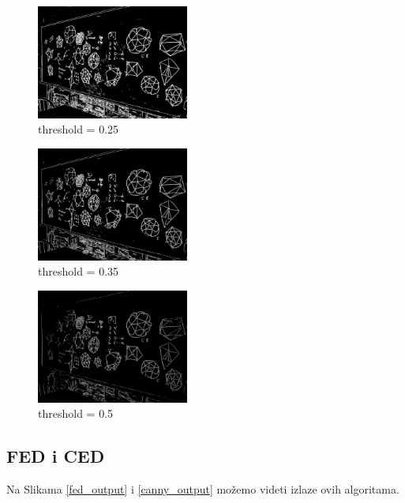 \documentclass[12pt,a4paper]{article}
\theoremstyle{definition}
\theoremstyle{remark}
\theoremstyle{plain}
\begin{document}
\begin{multicols}{3}
\begin{figure}[H]
\centering
\includegraphics[width=5cm]{images/blackboard_25.png}
  \caption{threshold = 0.25}
\end{figure}
\columnbreak
\begin{figure}[H]
\centering
\includegraphics[width=5cm]{images/blackboard_35.png}
  \caption{threshold = 0.35}
\end{figure}
\columnbreak
\begin{figure}[H]
\centering
\includegraphics[width=5cm]{images/blackboard_5.png}
  \caption{threshold = 0.5}
\end{figure}
\end{multicols}

\subsection{FED i CED}

Na Slikama \ref{fed_output} i \ref{canny_output} mo\v zemo videti izlaze ovih algoritama.
\end{document}
